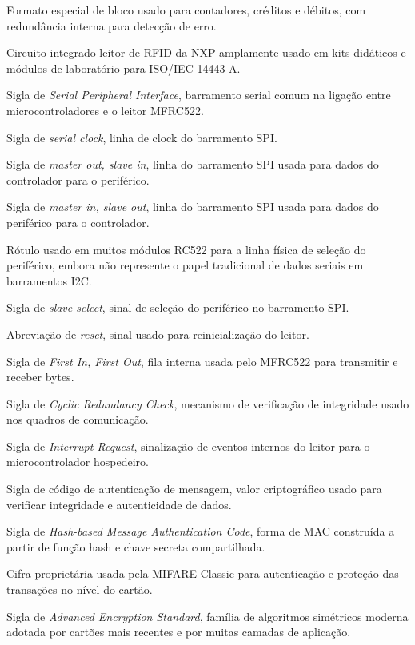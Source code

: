 \begin{description}[
  font=\normalfont\bfseries,
  style=multiline,
  leftmargin=5.6cm,
  labelwidth=4.9cm,
  labelsep=0.35cm,
  itemsep=0.55\baselineskip
]
  \item[Bloco de valor] Formato especial de bloco usado para contadores, créditos e débitos, com redundância interna para detecção de erro.
  \item[MFRC522] Circuito integrado leitor de RFID da NXP amplamente usado em kits didáticos e módulos de laboratório para ISO/IEC 14443 A.
  \item[SPI] Sigla de \textit{Serial Peripheral Interface}, barramento serial comum na ligação entre microcontroladores e o leitor MFRC522.
  \item[SCK] Sigla de \textit{serial clock}, linha de clock do barramento SPI.
  \item[MOSI] Sigla de \textit{master out, slave in}, linha do barramento SPI usada para dados do controlador para o periférico.
  \item[MISO] Sigla de \textit{master in, slave out}, linha do barramento SPI usada para dados do periférico para o controlador.
  \item[SDA] Rótulo usado em muitos módulos RC522 para a linha física de seleção do periférico, embora não represente o papel tradicional de dados seriais em barramentos I2C.
  \item[NSS] Sigla de \textit{slave select}, sinal de seleção do periférico no barramento SPI.
  \item[RST] Abreviação de \textit{reset}, sinal usado para reinicialização do leitor.
  \item[FIFO] Sigla de \textit{First In, First Out}, fila interna usada pelo MFRC522 para transmitir e receber bytes.
  \item[CRC] Sigla de \textit{Cyclic Redundancy Check}, mecanismo de verificação de integridade usado nos quadros de comunicação.
  \item[IRQ] Sigla de \textit{Interrupt Request}, sinalização de eventos internos do leitor para o microcontrolador hospedeiro.
  \item[MAC] Sigla de código de autenticação de mensagem, valor criptográfico usado para verificar integridade e autenticidade de dados.
  \item[HMAC] Sigla de \textit{Hash-based Message Authentication Code}, forma de MAC construída a partir de função hash e chave secreta compartilhada.
  \item[CRYPTO1] Cifra proprietária usada pela MIFARE Classic para autenticação e proteção das transações no nível do cartão.
  \item[AES] Sigla de \textit{Advanced Encryption Standard}, família de algoritmos simétricos moderna adotada por cartões mais recentes e por muitas camadas de aplicação.

\end{description}
